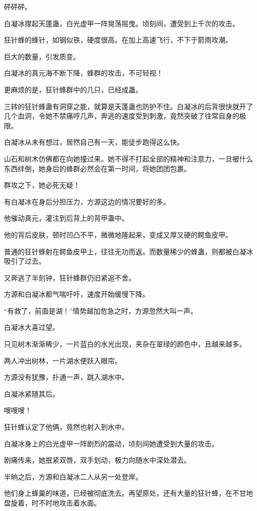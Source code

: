 \begin{this_body}
砰砰砰。

白凝冰撑起天蓬蛊，白光虚甲一阵晃荡摇曳。顷刻间，遭受到上千次的攻击。

狂针蜂的蜂针，如钢似铁，硬度很高。在加上高速飞行，不下于箭雨攻潮。

巨大的数量，引发质变。

白凝冰的真元海不断下降，蜂群的攻击，不可轻视！

更麻烦的是，狂针蜂群中的几只，已经成蛊。

三转的狂针蜂蛊有洞穿之能，就算是天蓬蛊也防护不住。白凝冰的后背很快就开了几个血洞，令她不禁痛哼几声，奔逃的速度受到刺激，竟然突破了往常自身的极限。

白凝冰从未有想过，居然自己有一天，能徒步跑得这么快。

山石和树木仿佛都在向她撞过来。她不得不打起全部的精神和注意力，一旦被什么东西绊倒，她身后的蜂群必然会在第一时间，将她团团包裹。

群攻之下，她必死无疑！

有白凝冰在身后分担压力，方源这边的情况要好的多。

他催动真元，灌注到后背上的背甲蛊中。

他的背后皮肤，顿时凹凸不平，微微地隆起来，变成又厚又硬的鳄鱼皮甲。

普通的狂针蜂射在鳄鱼皮甲上，往往无功而返。而数量稀少的蜂蛊，则都被白凝冰吸引了过去。

又奔逃了半刻钟，狂针蜂群仍旧紧追不舍。

方源和白凝冰都气喘吁吁，速度开始缓慢下降。

“有救了，前面是湖！”情势越加危急之时，方源忽然大叫一声。

白凝冰大喜过望。

只见树木渐渐稀少，一片蓝白的水光出现，夹杂在翠绿的颜色中，且越来越多。

两人冲出树林，一片湖水便跃入眼帘。

方源没有犹豫，扑通一声，跳入湖水中。

白凝冰紧随其后。

嗖嗖嗖！

狂针蜂认定了他俩，竟然也射入到水中。

白凝冰身上的白光虚甲一阵剧烈的震动，顷刻间她遭受到大量的攻击。

剧痛传来，她抿紧双唇，双手划动，极力向随水中深处潜去。

半晌之后，方源和白凝冰二人从另一处登岸。

他们身上蜂巢的味道，已经被彻底洗去。再望原处，还有大量的狂针蜂，在不甘地盘旋着，时不时地攻击着水面。


\end{this_body}
